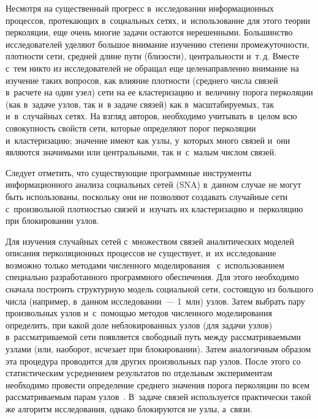 \begin{multicols}{2}
  Несмотря на существенный прогресс в~исследовании информационных 
процессов, про\-те\-ка\-ющих в~социальных сетях, и~использование для этого 
тео\-рии перколяции, еще очень многие задачи остаются нерешенными. 
Большинство исследователей уделяют большое внимание изучению степени 
про\-ме\-жу\-точ\-ности, плот\-ности сети, средней длине пути (бли\-зости), 
цент\-раль\-ности и~т.\,д. Вместе с~тем никто из исследователей не обращал еще 
це\-ле\-на\-прав\-лен\-но внимание на изуче\-ние таких вопросов, как влияние плот\-ности 
(среднего чис\-ла связей в~расчете на один узел) сети на ее кластеризацию 
и~величину порога перколяции (как в~задаче узлов, так и~в задаче связей) как 
в~масштабируемых, так и~в~случайных сетях. На взгляд авторов, необходимо 
учитывать в~целом всю со\-во\-куп\-ность свойств сети, которые определяют порог 
перколяции и~кластеризацию; значение имеют как узлы, у~которых много 
связей и~они явля\-ют\-ся значимыми или цент\-раль\-ны\-ми, так и~с~малым чис\-лом 
связей. 
  
  Следует отметить, что существующие про\-грам\-мные инструменты 
информационного анализа социальных сетей (SNA) в~данном случае не могут 
быть использованы, поскольку они не позволяют со\-зда\-вать случайные сети 
с~произвольной плот\-ностью связей и~изучать их клас\-те\-ри\-за\-цию и~перколяцию 
при блокировании узлов.
  
  Для изучения случайных сетей с~множеством связей аналитических моделей 
описания перколяционных процессов не существует, и~их исследование 
воз\-мож\-но только методами чис\-лен\-но\-го моделирования~\cite{12-zh, 13-zh} 
с~использованием специально разработанного программного обеспечения. Для 
этого необходимо сначала по\-стро\-ить структурную модель социальной сети, 
со\-сто\-ящую из большого чис\-ла (например, в~данном исследовании~--- 1~млн) узлов. Затем вы\-брать пару произвольных узлов и~с~по\-мощью 
методов чис\-лен\-но\-го моделирования определить, при какой доле 
неблокированных узлов (для задачи узлов) в~рас\-смат\-ри\-ва\-емой сети появляется 
свободный путь между рас\-смат\-ри\-ва\-емы\-ми узлами (или, наоборот, исчезает при 
блокировании). Затем аналогичным образом эта процедура проводится для 
других произвольных пар узлов. После этого со статистическим усреднением 
результатов по отдельным экспериментам необходимо про\-вес\-ти определение 
сред\-не\-го значения порога перколяции по всем рас\-смат\-ри\-ва\-емым парам 
узлов~\cite{13-zh, 14-zh}. В~задаче связей используется практически такой же 
алгоритм исследования, однако блокируются не узлы, а~связи. 


\end{multicols}
